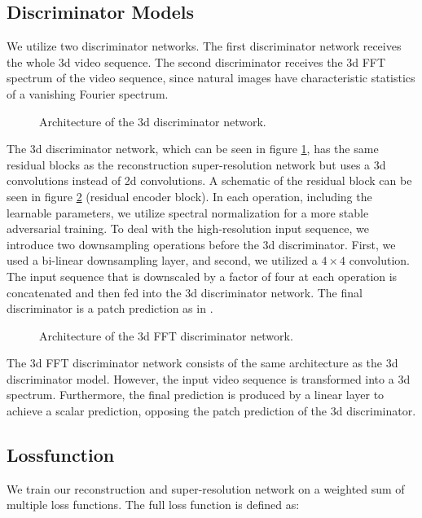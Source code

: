 \documentclass[10pt,twocolumn,letterpaper]{article}
\begin{document}
\subsection{Discriminator Models} \label{subsec:discriminator}
We utilize two discriminator networks. The first discriminator network receives the whole 3d video sequence. The second discriminator receives the 3d FFT spectrum of the video sequence, since natural images have characteristic statistics of a vanishing Fourier spectrum. \cite{deepfovea}\\

\begin{figure}[htbp!]
    \centering
    
    \caption{Architecture of the 3d discriminator network.}
    \label{fig:discriminatornetwork}
\end{figure}

The 3d discriminator network, which can be seen in figure \ref{fig:discriminatornetwork}, has the same residual blocks as the reconstruction super-resolution network but uses a 3d convolutions instead of 2d convolutions. A schematic of the residual block can be seen in figure \ref{fig:fftdiscriminatornetwork} (residual encoder block). In each operation, including the learnable parameters, we utilize spectral normalization \cite{spectralnorm} for a more stable adversarial training. To deal with the high-resolution input sequence, we introduce two downsampling operations before the 3d discriminator. First, we used a bi-linear downsampling layer, and second, we utilized a $4\times 4$ convolution. The input sequence that is downscaled by a factor of four at each operation is concatenated and then fed into the 3d discriminator network. The final discriminator is a patch prediction as in \cite{patchgan}.

\begin{figure}[htbp!]
    \centering
    
    \caption{Architecture of the 3d FFT discriminator network.}
    \label{fig:fftdiscriminatornetwork}
\end{figure}

The 3d FFT discriminator network consists of the same architecture as the 3d discriminator model. However, the input video sequence is transformed into a 3d spectrum. Furthermore, the final prediction is produced by a linear layer to achieve a scalar prediction, opposing the patch prediction of the 3d discriminator. \cite{deepfovea}

\subsection{Lossfunction} \label{subsec:lossfunction}
We train our reconstruction and super-resolution network on a weighted sum of multiple loss functions. The full loss function is defined as:
\end{document}
